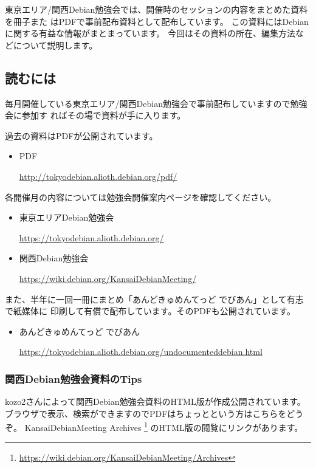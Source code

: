 \documentclass[mingoth,a4paper]{jsarticle}
\begin{document}
東京エリア/関西Debian勉強会では、開催時のセッションの内容をまとめた資料を冊子また
はPDFで事前配布資料として配布しています。
この資料にはDebianに関する有益な情報がまとまっています。
今回はその資料の所在、編集方法などについて説明します。

\subsection{読むには}

毎月開催している東京エリア/関西Debian勉強会で事前配布していますので勉強会に参加す
ればその場で資料が手に入ります。

過去の資料はPDFが公開されています。

\begin{itemize}
\item PDF

  \url{http://tokyodebian.alioth.debian.org/pdf/}
\end{itemize}

各開催月の内容については勉強会開催案内ページを確認してください。

\begin{itemize}
\item 東京エリアDebian勉強会

  \url{https://tokyodebian.alioth.debian.org/}
\item 関西Debian勉強会

  \url{https://wiki.debian.org/KansaiDebianMeeting/}
\end{itemize}

また、半年に一回一冊にまとめ「あんどきゅめんてっど でびあん」として有志で紙媒体に
印刷して有償で配布しています。そのPDFも公開されています。

\begin{itemize}
\item あんどきゅめんてっど でびあん

  \url{https://tokyodebian.alioth.debian.org/undocumenteddebian.html}
\end{itemize}

\subsubsection{関西Debian勉強会資料のTips}

kozo2さんによって関西Debian勉強会資料のHTML版が作成公開されています。
ブラウザで表示、検索ができますのでPDFはちょっとという方はこちらをどうぞ。
KansaiDebianMeeting Archives
\footnote{\url{https://wiki.debian.org/KansaiDebianMeeting/Archives}}
のHTML版の閲覧にリンクがあります。
\end{document}
